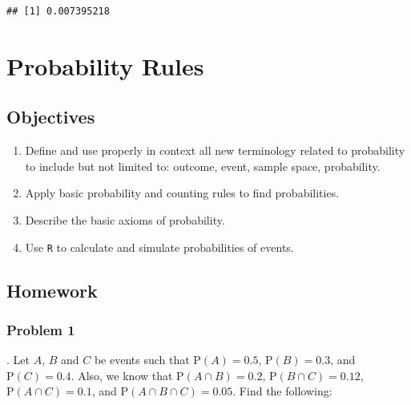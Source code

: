 \documentclass[
]{book}
\providecommand{\tightlist}{%
  \setlength{\itemsep}{0pt}\setlength{\parskip}{0pt}}
\begin{document}
\begin{verbatim}
## [1] 0.007395218
\end{verbatim}

\hypertarget{PROBRULES}{%
\chapter{Probability Rules}\label{PROBRULES}}

\newcommand{\E}{\mbox{E}}
\newcommand{\Var}{\mbox{Var}}
\newcommand{\Cov}{\mbox{Cov}}
\newcommand{\Prob}{\mbox{P}}
\newcommand*\diff{\mathop{}\!\mathrm{d}}

\hypertarget{objectives-7}{%
\section{Objectives}\label{objectives-7}}

\begin{enumerate}
\def\labelenumi{\arabic{enumi})}
\tightlist
\item
  Define and use properly in context all new terminology related to probability to include but not limited to: outcome, event, sample space, probability.\\
\item
  Apply basic probability and counting rules to find probabilities.\\
\item
  Describe the basic axioms of probability.\\
\item
  Use \texttt{R} to calculate and simulate probabilities of events.
\end{enumerate}

\hypertarget{homework-7}{%
\section{Homework}\label{homework-7}}

\hypertarget{problem-1-7}{%
\subsection{Problem 1}\label{problem-1-7}}

. Let \(A\), \(B\) and \(C\) be events such that \(\mbox{P}(A)=0.5\), \(\mbox{P}(B)=0.3\), and \(\mbox{P}(C)=0.4\). Also, we know that \(\mbox{P}(A \cap B)=0.2\), \(\mbox{P}(B \cap C)=0.12\), \(\mbox{P}(A \cap C)=0.1\), and \(\mbox{P}(A \cap B \cap C)=0.05\). Find the following:
\end{document}
